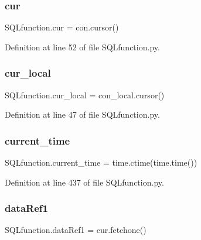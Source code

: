 \subsubsection{\texorpdfstring{cur}{cur}}
{\footnotesize\ttfamily S\+Q\+Lfunction.\+cur = con.\+cursor()}



Definition at line 52 of file S\+Q\+Lfunction.\+py.

\mbox{\label{namespace_s_q_lfunction_a808a7ba686f9086b3d4ef7d6a969aceb}} 
\subsubsection{\texorpdfstring{cur\+\_\+local}{cur\_local}}
{\footnotesize\ttfamily S\+Q\+Lfunction.\+cur\+\_\+local = con\+\_\+local.\+cursor()}



Definition at line 47 of file S\+Q\+Lfunction.\+py.

\mbox{\label{namespace_s_q_lfunction_affebcb967a2b844a9e7542f181deacb6}} 
\subsubsection{\texorpdfstring{current\+\_\+time}{current\_time}}
{\footnotesize\ttfamily S\+Q\+Lfunction.\+current\+\_\+time = time.\+ctime(time.\+time())}



Definition at line 437 of file S\+Q\+Lfunction.\+py.

\mbox{\label{namespace_s_q_lfunction_aab5e54d1ed091926790df37c8098f1f7}} 
\subsubsection{\texorpdfstring{data\+Ref1}{dataRef1}}
{\footnotesize\ttfamily S\+Q\+Lfunction.\+data\+Ref1 = cur.\+fetchone()}



